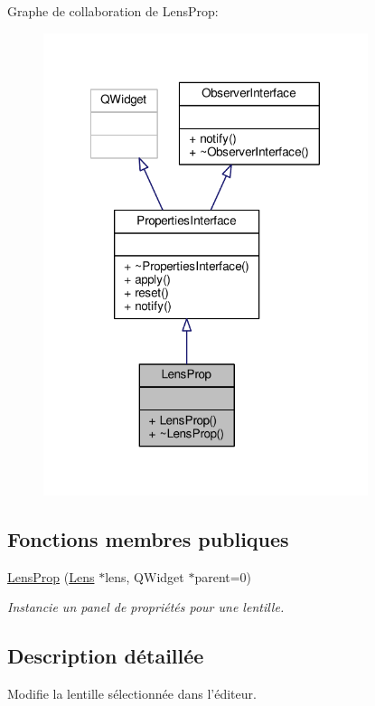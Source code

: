 Graphe de collaboration de Lens\+Prop\+:\nopagebreak
\begin{figure}[H]
\begin{center}
\leavevmode
\includegraphics[width=269pt]{de/d14/classLensProp__coll__graph}
\end{center}
\end{figure}
\subsection*{Fonctions membres publiques}
\begin{DoxyCompactItemize}
\item 
\hyperlink{classLensProp_a2a9f54d768d72f8ad69e1572259d2a85}{Lens\+Prop} (\hyperlink{classLens}{Lens} $\ast$lens, Q\+Widget $\ast$parent=0)
\begin{DoxyCompactList}\small\item\em Instancie un panel de propriétés pour une lentille. \end{DoxyCompactList}\end{DoxyCompactItemize}


\subsection{Description détaillée}
Modifie la lentille sélectionnée dans l’éditeur. 

